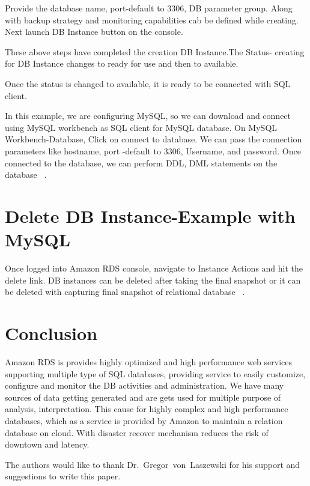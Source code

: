 Provide the database name, port-default to 3306, DB parameter group. 
Along with backup strategy and monitoring capabilities cab be defined 
while creating.
Next launch DB Instance button on the console.

These above steps have completed the creation DB Instance.The Status- 
creating for DB Instance changes to ready for use and then to available.

Once the status is changed to available, it is ready to be connected 
with SQL client.

In this example, we are configuring MySQL, so we can download and connect 
using MySQL workbench as SQL client for MySQL database. 
On MySQL Workbench-Database, Click on connect to database. We 
can pass the connection parameters like hostname, port -default to 3306, 
Username, and password.
Once connected to the database, we can perform DDL, DML 
statements on the database
~\cite{hid-sp18-520-amazonrdscreatesteps}.

\section{Delete DB Instance-Example with MySQL}

Once logged into Amazon RDS console, navigate to Instance Actions 
and hit the delete link.
DB instances can be deleted after taking the final snapshot or it can be 
deleted with capturing final snapshot of relational database
~\cite{hid-sp18-520-amazonrdscreatesteps}.

\section{Conclusion}
Amazon RDS is provides highly optimized and high performance web services
supporting multiple type of SQL databases, providing service to easily 
customize, configure and monitor the DB activities and administration.
We have many sources of data getting generated and are gets used for 
multiple purpose of analysis, interpretation. This cause for highly complex
and high performance databases, which as a service is provided by Amazon to 
maintain a relation database on cloud. With disaster recover mechanism reduces
the risk of downtown and latency.

\begin{acks}
  The authors would like to thank Dr.~Gregor~von~Laszewski for his
  support and suggestions to write this paper.
\end{acks}



 
